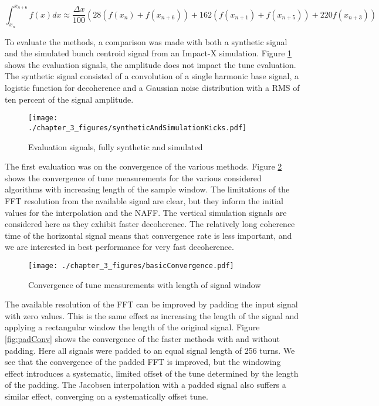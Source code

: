 \begin{equation}
	\int_{x_{n}}^{x_{n+6}}f(x)dx \approx \frac{\Delta x}{100}\left(28(f(x_n) + f(x_{n+6})) + 162(f(x_{n+1}) + f(x_{n+5})) + 220 f(x_{n+3}) \right)
	\label{eq:hardy}
\end{equation}

To evaluate the methods, a comparison was made with both a synthetic signal and the simulated bunch centroid signal from an Impact-X simulation. Figure \ref{fig:synKicks} shows the evaluation signals, the amplitude does not impact the tune evaluation. The synthetic signal consisted of a convolution of a single harmonic base signal, a logistic function for decoherence and a Gaussian noise distribution with a RMS of ten percent of the signal amplitude. 

\begin{figure}
	\centering
	\texttt{[image: ./chapter\_3\_figures/syntheticAndSimulationKicks.pdf]}
	\caption{Evaluation signals, fully synthetic and simulated}
	\label{fig:synKicks}
\end{figure}

The first evaluation was on the convergence of the various methods. Figure \ref{fig:baseConv} shows the convergence of tune measurements for the various considered algorithms with increasing length of the sample window. The limitations of the FFT resolution from the available signal are clear, but they inform the initial values for the interpolation and the NAFF. The vertical simulation signals are considered here as they exhibit faster decoherence. The relatively long coherence time of the horizontal signal means that convergence rate is less important, and we are interested in best performance for very fast decoherence.

\begin{figure}
	\centering
	\texttt{[image: ./chapter\_3\_figures/basicConvergence.pdf]}
	\caption{Convergence of tune measurements with length of signal window}
	\label{fig:baseConv}
\end{figure}

The available resolution of the FFT can be improved by padding the input signal with zero values. This is the same effect as increasing the length of the signal and applying a rectangular window the length of the original signal. Figure \ref{fig:padConv} shows the convergence of the faster methods with and without padding. Here all signals were padded to an equal signal length of 256 turns. We see that the convergence of the padded FFT is improved, but the windowing effect introduces a systematic, limited offset of the tune determined by the length of the padding. The Jacobsen interpolation with a padded signal also suffers a similar effect, converging on a systematically offset tune.

